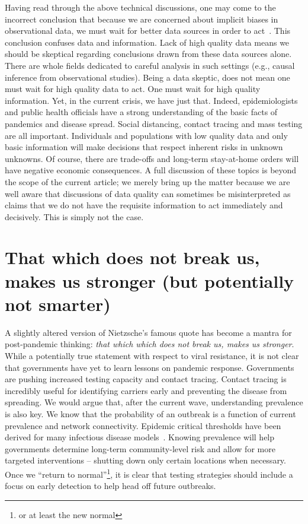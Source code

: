 \documentclass[aoas]{amsart}
\begin{document}
Having read through the above technical discussions, one may come to the incorrect conclusion that because we are concerned about implicit biases in observational data, we must wait for better data sources in order to act~\citep{Ioannidis2020}.  This conclusion confuses data and information.  Lack of high quality data means we should be skeptical regarding conclusions drawn from these data sources alone.  There are whole fields dedicated to careful analysis in such settings (e.g., causal inference from observational studies).  Being a data skeptic, does not mean one must wait for high quality data to act.  One must wait for high quality information.  Yet, in the current crisis, we have just that.  Indeed, epidemiologists and public health officials have a strong understanding of the basic facts of pandemics and disease spread.  Social distancing, contact tracing and mass testing are all important.  Individuals and populations with low quality data and only basic information will make decisions that respect inherent risks in unknown unknowns. Of course, there are trade-offs and long-term stay-at-home orders will have negative economic consequences.  A full discussion of these topics is beyond the scope of the current article; we merely bring up the matter because we are well aware that discussions of data quality can sometimes be misinterpreted as claims that we do not have the requisite information to act immediately and decisively.  This is simply not the case.

\section{That which does not break us, makes us stronger (but potentially not smarter)}
\label{section:testingcomments}

A slightly altered version of Nietzsche's famous quote has become a mantra for post-pandemic thinking: \emph{that which which does not break us, makes us stronger}.  While a potentially true statement with respect to viral resistance, it is not clear that governments have yet to learn lessons on pandemic response. Governments are pushing increased testing capacity and contact tracing.  Contact tracing is incredibly useful for identifying carriers early and preventing the disease from spreading.  We would argue that, after the current wave, understanding prevalence is also key.  We know that the probability of an outbreak is a function of current prevalence and network connectivity.  Epidemic critical thresholds have been derived for many infectious disease models~\cite{Pastor2001,Newman2002,Parshani2010}.  Knowing prevalence will help governments determine long-term community-level risk and allow for more targeted interventions -- shutting down only certain locations when necessary. Once we ``return to normal''\footnote{or at least the new normal}, it is clear that testing strategies should include a focus on early detection to help head off future outbreaks.
\end{document}

